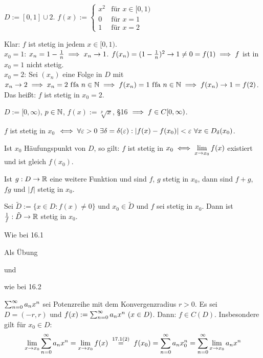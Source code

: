 \documentclass[a4paper,twoside,DIV15,BCOR12mm]{scrbook}
\begin{document}
\begin{beispiele}
\item $D:= [0,1]\cup{2}$. $f(x) := \begin{cases} x^2 & \text{für } x\in[0,1) \\ 0 & \text{für } x = 1 \\ 1 & \text{für } x=2 \end{cases}$

Klar: $f$ ist stetig in jedem $x\in[0,1)$.\\
$x_0 = 1$: $x_n = 1- \frac{1}{n} \implies x_n \to 1$. $f(x_n) = (1-\frac{1}{n})^2\to1 \ne0 = f(1) \implies f$ ist in $x_0 = 1$ nicht stetig. \\
$x_0 = 2$: Sei $(x_n)$ eine Folge in $D$ mit $x_n \to 2 \implies x_n = 2 \text{ f\/fa } n\in\mathbb{N} \implies f(x_n) = 1 \text{ f\/fa } n\in\mathbb{N} \implies f(x_n) \to 1 = f(2)$. Das heißt: $f$ ist stetig in $x_0 = 2$.
\item $D:= [0,\infty)$, $p\in\mathbb{N}$, $f(x) := \sqrt[p]{x}$, §16 $\implies f \in C[0,\infty)$.
\end{beispiele}

\begin{satz}[Stetigkeitssätze]
\begin{liste}
\item $f$ ist stetig in $x_0$ $\iff \forall \varepsilon > 0\  \exists \delta = \delta(\varepsilon): |f(x)-f(x_0)|<\varepsilon \ \forall x\in D_\delta(x_0)$.
\item Ist $x_0$ Häufungspunkt von $D$, so gilt: $f$ ist stetig in $x_0 \iff \displaystyle\lim_{x\to x_0}f(x)$ existiert und ist gleich $f(x_0)$.
\item Ist $g: D\to \mathbb{R}$ eine weitere Funktion und sind $f$, $g$ stetig in $x_0$, dann sind $f+g$, $fg$ und $|f|$ stetig in $x_0$.
\item Sei $\tilde D := \{x\in D: f(x)\ne0\}$ und $x_0 \in \tilde D$ und $f$ sei stetig in $x_0$. Dann ist $\frac{1}{f}: \tilde D\to\mathbb{R}$ stetig in $x_0$.
\end{liste}
\end{satz}

\begin{beweise}
\item Wie bei 16.1
\item Als Übung
\item und
\item wie bei 16.2
\end{beweise}

\begin{satz}
$\sum_{n=0}^{\infty}{a_n x^n}$ sei Potenzreihe mit dem Konvergenzradius $r>0$. Es sei $D=(-r,r)$ und $f(x) := \sum_{n=0}^{\infty}{a_nx^n}\ (x\in D)$. Dann: $f \in C(D)$. Insbesondere gilt für $x_0 \in D:$
$$\lim_{x\to x_0} \reihenull{a_nx^n} = \lim_{x\to x_0} f(x) \gleichnach{17.1(2)} f(x_0) = \reihenull{a_nx_0^n} = \reihenull{\lim_{x\to x_0}a_nx^n}$$
\end{satz}
\end{document}
